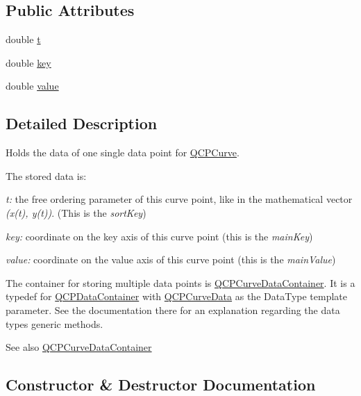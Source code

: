 \subsection*{Public Attributes}
\begin{DoxyCompactItemize}
\item 
double \mbox{\hyperlink{class_q_c_p_curve_data_aecc395525be28e9178a088793beb3ff3}{t}}
\item 
double \mbox{\hyperlink{class_q_c_p_curve_data_a8a4ec5f2b9a396149fd842e309701bd4}{key}}
\item 
double \mbox{\hyperlink{class_q_c_p_curve_data_a72b39b8e1dbf7b45382ebd48419b6828}{value}}
\end{DoxyCompactItemize}


\subsection{Detailed Description}
Holds the data of one single data point for \mbox{\hyperlink{class_q_c_p_curve}{Q\+C\+P\+Curve}}. 

The stored data is\+: \begin{DoxyItemize}
\item {\itshape t\+:} the free ordering parameter of this curve point, like in the mathematical vector {\itshape (x(t), y(t))}. (This is the {\itshape sort\+Key}) \item {\itshape key\+:} coordinate on the key axis of this curve point (this is the {\itshape main\+Key}) \item {\itshape value\+:} coordinate on the value axis of this curve point (this is the {\itshape main\+Value})\end{DoxyItemize}
The container for storing multiple data points is \mbox{\hyperlink{qcustomplot_8h_aaeee80d5664ea91beb9d7968790d0e65}{Q\+C\+P\+Curve\+Data\+Container}}. It is a typedef for \mbox{\hyperlink{class_q_c_p_data_container}{Q\+C\+P\+Data\+Container}} with \mbox{\hyperlink{class_q_c_p_curve_data}{Q\+C\+P\+Curve\+Data}} as the Data\+Type template parameter. See the documentation there for an explanation regarding the data type\textquotesingle{}s generic methods.

\begin{DoxySeeAlso}{See also}
\mbox{\hyperlink{qcustomplot_8h_aaeee80d5664ea91beb9d7968790d0e65}{Q\+C\+P\+Curve\+Data\+Container}} 
\end{DoxySeeAlso}


\subsection{Constructor \& Destructor Documentation}
\mbox{\label{class_q_c_p_curve_data_a48252779b5198a509d99c69ae223fbf8}} 
